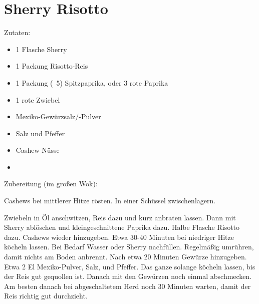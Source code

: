 \section{Sherry Risotto}
Zutaten:
\begin{itemize}
    \item 1 Flasche Sherry
    \item 1 Packung Risotto-Reis
    \item 1 Packung (~5) Spitzpaprika, oder 3 rote Paprika
    \item 1 rote Zwiebel
    \item Mexiko-Gewürzsalz/-Pulver
    \item Salz und Pfeffer
    \item Cashew-Nüsse
    \item 
\end{itemize}

\noindent Zubereitung (im großen Wok):

\noindent Cashews bei mittlerer Hitze rösten. In einer Schüssel zwischenlagern.

Zwiebeln in Öl anschwitzen, Reis dazu und kurz anbraten lassen. Dann mit
Sherry ablöschen und kleingeschnittene Paprika dazu. Halbe Flasche
Risotto dazu. Cashews wieder hinzugeben. Etwa 30-40 Minuten bei niedriger Hitze köcheln lassen. Bei
Bedarf Wasser oder Sherry nachfüllen. Regelmäßig umrühren, damit nichts
am Boden anbrennt. Nach etwa 20 Minuten Gewürze hinzugeben. Etwa 2 El
Mexiko-Pulver, Salz, und Pfeffer. Das ganze solange köcheln lassen, bis
der Reis gut gequollen ist. Danach mit den Gewürzen noch einmal abschmecken. Am besten danach bei abgeschaltetem Herd noch 30 Minuten warten, damit der Reis richtig gut durchzieht.

\newpage
\mbox{}
\vfill
\begin{center}
\end{center}
\vfill
\mbox{ }
\newpage
